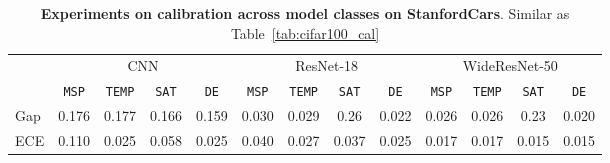 \begin{table}[h]
\fontsize{9}{10}\selectfont
\setlength{\tabcolsep}{5pt}
\caption{\textbf{Experiments on calibration across model classes on StanfordCars}. Similar as Table~\ref{tab:cifar100_cal}}
\vspace{5pt}
\label{tab:stanfordcars_cal}
\centering
\begin{tabular}{lcccccccccccc}
\toprule
 & \multicolumn{4}{c}{CNN} & \multicolumn{4}{c}{ResNet-18} & \multicolumn{4}{c}{WideResNet-50} \\
\cmidrule(r){2-5} \cmidrule(r){6-9} \cmidrule(r){10-13}
 & \texttt{MSP} & \texttt{TEMP} & \texttt{SAT} & \texttt{DE} & \texttt{MSP} & \texttt{TEMP} & \texttt{SAT} & \texttt{DE} & \texttt{MSP} & \texttt{TEMP} & \texttt{SAT} & \texttt{DE} \\
\midrule
Gap & 0.176 & 0.177 & 0.166 & 0.159 & 0.030 & 0.029 & 0.26 & 0.022 & 0.026 & 0.026 & 0.23 & 0.020 \\
ECE & 0.110 & 0.025 & 0.058 & 0.025 & 0.040 & 0.027 & 0.037 & 0.025 & 0.017 & 0.017 & 0.015 & 0.015 \\
\bottomrule
\end{tabular}
\end{table}